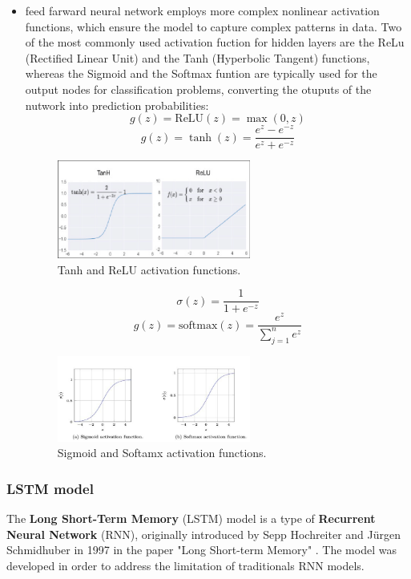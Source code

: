 \begin{itemize}
    \item feed farward neural network employs more complex nonlinear activation functions, which ensure the model to capture complex patterns in data. Two of the most commonly used activation fuction for hidden layers are the ReLu (Rectified Linear Unit) and the Tanh (Hyperbolic Tangent) functions, whereas the Sigmoid and the Softmax funtion are typically used for the output nodes for classification problems, converting the otuputs of the nutwork into prediction probabilities:  
    \[
    g(z) = \text{ReLU}(z) = \max(0, z)
    \]
    \[
    g(z) = \tanh(z) = \frac{e^z - e^{-z}}{e^z + e^{-z}}
    \]
    \begin{figure}[H] 
    \centering
    \includegraphics[width=0.6\textwidth]{Machine_learning_thesis/Images/Tanh-and-ReLU-activation-functions.png}
    \caption{Tanh and ReLU activation functions.} 
    \label{fig:Tanh and ReLU activation functions} 
    \end{figure}

    \[
    \sigma(z) = \frac{1}{1 + e^{-z}}
    \]
    \[
    g(z) = \text{softmax}(z) = \frac{e^{z}}{\sum_{j=1}^n e^{z}}
    \]
    \begin{figure}[H] 
    \centering
    \includegraphics[width=0.6\textwidth]{Machine_learning_thesis/Images/sigmoid and softmax functions.png}
    \caption{Sigmoid and Softamx activation functions.} 
    \label{fig:Sigmoid and Softamx activation functions} 
    \end{figure}
    
\end{itemize}

\subsubsection{LSTM model}
The \textbf{Long Short-Term Memory} (LSTM) model is a type of \textbf{Recurrent Neural Network} (RNN), originally introduced by  Sepp Hochreiter and Jürgen Schmidhuber in 1997 in the paper "Long Short-term Memory" \cite{hochreiter1997long}. The model was developed in order to address the limitation of traditionals RNN models. 

